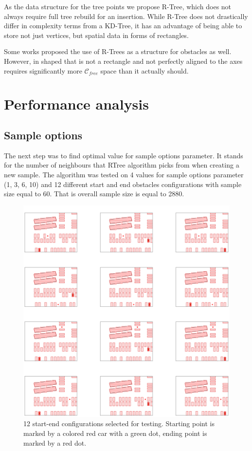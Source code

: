 \documentclass[12pt]{article}
\DeclareRobustCommand{\[}{\begin{equation}}
\DeclareRobustCommand{\]}{\end{equation}}
\numberwithin{equation}{section}
\begin{document}
As the data structure for the tree points we propose R-Tree, which does not always require full tree rebuild for an insertion.
While R-Tree does not drastically differ in complexity terms from a KD-Tree, it has an advantage of being able to store not just vertices,
but spatial data in forms of rectangles.

Some works proposed the use of R-Trees as a structure for obstacles as well. However, in shaped that is not a rectangle and not perfectly aligned to the axes requires significantly
more $\mathcal{C}_{free}$ space than it actually should.

\section{Performance analysis}

\subsection{Sample options}

The next step was to find optimal value for sample options parameter. It stands for the number of neighbours that RTree algorithm picks from when creating a new sample. The algorithm was tested on 4 values for sample options parameter (1, 3, 6, 10) and 12 different start and end obstacles configurations with sample size equal to 60. That is overall sample size is equal to 2880.

\begin{figure}[H]
\begin{center}
\includegraphics[scale=0.4]{images/12positions.png}
\captionsetup{width=0.6\textwidth}
\caption{12 start-end configurations selected for testing. Starting point is marked by a colored red car with a green dot, ending point is marked by a red dot.}
\end{center}
\end{figure}
\end{document}
